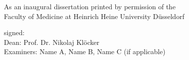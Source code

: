 \documentclass[crop=false]{standalone}
\begin{document}
\thispagestyle{empty}
\begin{flushleft}
\vspace*{\fill}
\noindent As an inaugural dissertation printed by permission of the \\
\noindent Faculty of Medicine at Heinrich Heine University Düsseldorf
\vspace*{1\baselineskip}

\noindent signed: \\
\noindent Dean: Prof. Dr. Nikolaj Klöcker \\
\noindent Examiners: Name A, Name B, Name C (if applicable)

\vspace*{2\baselineskip}
\end{flushleft}
\end{document}
